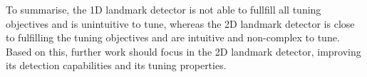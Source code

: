 To summarise, the 1D landmark detector is not able to fullfill all tuning objectives and is unintuitive to tune, whereas the 2D landmark detector is close to fulfilling the tuning objectives and are intuitive and non-complex to tune. Based on this, further work should focus in the 2D landmark detector, improving its detection capabilities and its tuning properties.  
